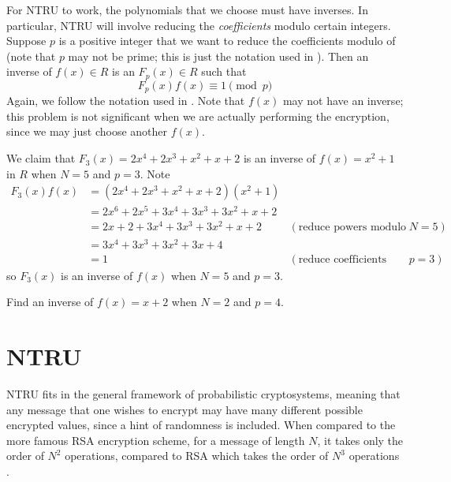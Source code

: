 For NTRU to work, the polynomials that we choose must have inverses. In particular, NTRU will involve reducing the \textit{coefficients} modulo certain integers. Suppose $p$ is a positive integer that we want to reduce the coefficients modulo of (note that $p$ may not be prime; this is just the notation used in \cite[\S~1.1]{hoffstein_pipher_silverman_1998}). Then an inverse of $f(x) \in R$ is an $F_p(x) \in R$ such that
\[
    F_p(x)f(x) \equiv 1 \pmod p
\]
Again, we follow the notation used in \cite{hoffstein_pipher_silverman_1998}. Note that $f(x)$ may not have an inverse; this problem is not significant when we are actually performing the encryption, since we may just choose another $f(x)$.

\begin{example}
    We claim that $F_3(x) = 2x^4 + 2x^3 + x^2 + x + 2$ is an inverse of $f(x) = x^2 + 1$ in $R$ when $N = 5$ and $p = 3$. Note
    \begin{align*}
        F_3(x)f(x) &= (2x^4 + 2x^3 + x^2 + x + 2)(x^2+1)\\
        &= 2x^6 + 2x^5 + 3x^4 + 3x^3 + 3x^2 + x + 2\\
        &= 2x + 2 + 3x^4 + 3x^3 + 3x^2 + x + 2 & (\text{reduce powers modulo }N = 5)\\
        &= 3x^4 + 3x^3 + 3x^2 + 3x + 4\\
        &= 1 & (\text{reduce coefficients modulo } p = 3)
    \end{align*}
    so $F_3(x)$ is an inverse of $f(x)$ when $N = 5$ and $p = 3$.
\end{example}

\begin{exercise}
    Find an inverse of $f(x) = x + 2$ when $N = 2$ and $p = 4$.
\end{exercise}

\section{NTRU}
NTRU fits in the general framework of probabilistic cryptosystems, meaning that any message that one wishes to encrypt may have many different possible encrypted values, since a hint of randomness is included. When compared to the more famous RSA encryption scheme, for a message of length $N$, it takes only the order of $N^2$ operations, compared to RSA which takes the order of $N^3$ operations \cite[p.~268]{hoffstein_pipher_silverman_1998}.

